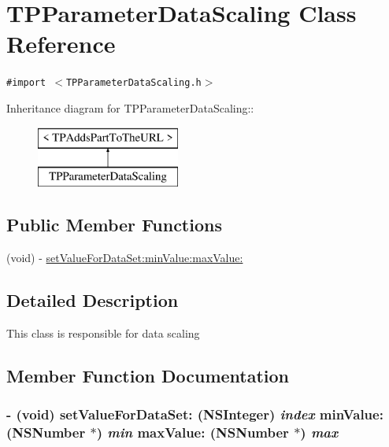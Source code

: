 \hypertarget{interface_t_p_parameter_data_scaling}{
\section{TPParameterDataScaling Class Reference}
\label{interface_t_p_parameter_data_scaling}
}
{\tt \#import $<$TPParameterDataScaling.h$>$}

Inheritance diagram for TPParameterDataScaling::\begin{figure}[H]
\begin{center}
\leavevmode
\includegraphics[height=2cm]{interface_t_p_parameter_data_scaling}
\end{center}
\end{figure}
\subsection*{Public Member Functions}
\begin{CompactItemize}
\item 
(void) - \hyperlink{interface_t_p_parameter_data_scaling_3dfe9bc7aed1db751668d2b35ed5f96a}{setValueForDataSet:minValue:maxValue:}
\end{CompactItemize}


\subsection{Detailed Description}
This class is responsible for data scaling 

\subsection{Member Function Documentation}
\hypertarget{interface_t_p_parameter_data_scaling_3dfe9bc7aed1db751668d2b35ed5f96a}{
\subsubsection[{setValueForDataSet:minValue:maxValue:}]{\setlength{\rightskip}{0pt plus 5cm}- (void) setValueForDataSet: (NSInteger) {\em index}\/ minValue: (NSNumber $\ast$) {\em min}\/ maxValue: (NSNumber $\ast$) {\em max}}}
\label{interface_t_p_parameter_data_scaling_3dfe9bc7aed1db751668d2b35ed5f96a}


